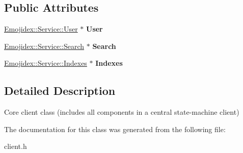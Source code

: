 \subsection*{Public Attributes}
\begin{DoxyCompactItemize}
\item 
\hyperlink{classEmojidex_1_1Service_1_1User}{Emojidex\+::\+Service\+::\+User} $\ast$ {\bfseries User}\hypertarget{classEmojidex_1_1Client_aa81c4d93a3c5f7c052ec51480940bcf9}{}\label{classEmojidex_1_1Client_aa81c4d93a3c5f7c052ec51480940bcf9}

\item 
\hyperlink{classEmojidex_1_1Service_1_1Search}{Emojidex\+::\+Service\+::\+Search} $\ast$ {\bfseries Search}\hypertarget{classEmojidex_1_1Client_a78ab88058c7ae2b4ca94912da4dde033}{}\label{classEmojidex_1_1Client_a78ab88058c7ae2b4ca94912da4dde033}

\item 
\hyperlink{classEmojidex_1_1Service_1_1Indexes}{Emojidex\+::\+Service\+::\+Indexes} $\ast$ {\bfseries Indexes}\hypertarget{classEmojidex_1_1Client_a1b05ff602e2be8497d6def01c52d5a23}{}\label{classEmojidex_1_1Client_a1b05ff602e2be8497d6def01c52d5a23}

\end{DoxyCompactItemize}


\subsection{Detailed Description}
Core client class (includes all components in a central state-\/machine client) 

The documentation for this class was generated from the following file\+:\begin{DoxyCompactItemize}
\item 
client.\+h\end{DoxyCompactItemize}
